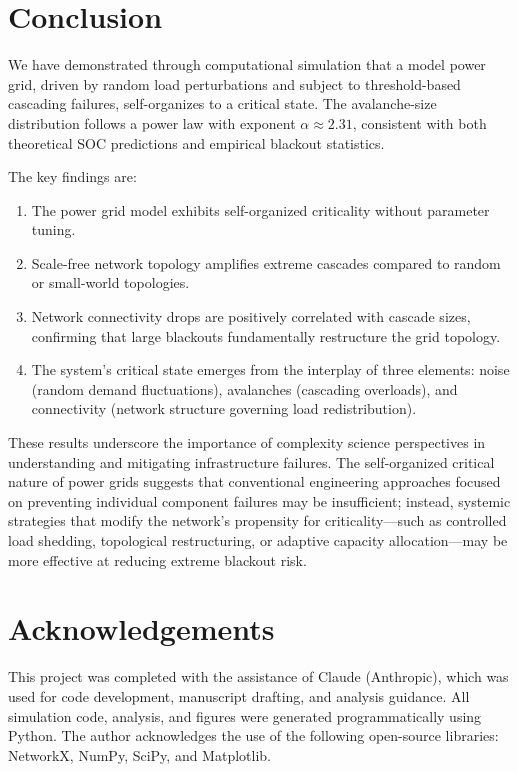 \documentclass[12pt,a4paper]{article}
\begin{document}
\section{Conclusion}
\label{sec:conclusion}

We have demonstrated through computational simulation that a model power grid, driven by random load perturbations and subject to threshold-based cascading failures, self-organizes to a critical state.
The avalanche-size distribution follows a power law with exponent $\alpha \approx 2.31$, consistent with both theoretical SOC predictions and empirical blackout statistics.

The key findings are:
\begin{enumerate}[leftmargin=2em]
  \item The power grid model exhibits self-organized criticality without parameter tuning.
  \item Scale-free network topology amplifies extreme cascades compared to random or small-world topologies.
  \item Network connectivity drops are positively correlated with cascade sizes, confirming that large blackouts fundamentally restructure the grid topology.
  \item The system's critical state emerges from the interplay of three elements: noise (random demand fluctuations), avalanches (cascading overloads), and connectivity (network structure governing load redistribution).
\end{enumerate}

These results underscore the importance of complexity science perspectives in understanding and mitigating infrastructure failures.
The self-organized critical nature of power grids suggests that conventional engineering approaches focused on preventing individual component failures may be insufficient; instead, systemic strategies that modify the network's propensity for criticality---such as controlled load shedding, topological restructuring, or adaptive capacity allocation---may be more effective at reducing extreme blackout risk.


\section*{Acknowledgements}

This project was completed with the assistance of Claude (Anthropic), which was used for code development, manuscript drafting, and analysis guidance.
All simulation code, analysis, and figures were generated programmatically using Python.
The author acknowledges the use of the following open-source libraries: NetworkX, NumPy, SciPy, and Matplotlib.
\end{document}
